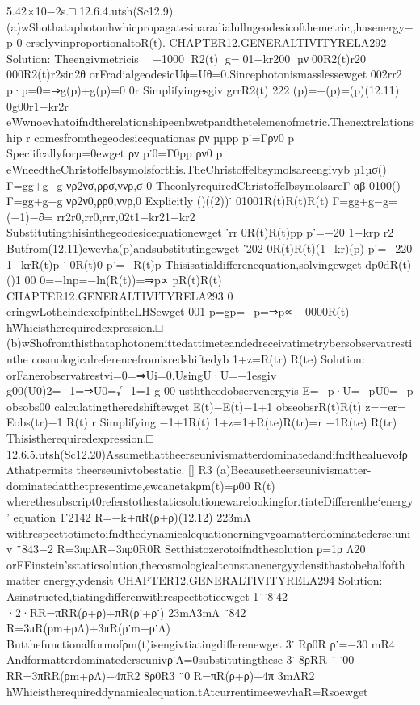 {{{{{{{{{{{{{{{{5.42×10−2s.□
12.6.4.utsh(Sc12.9)
(a)wShothataphotonhwhicpropagatesinaradialullngeodesicofthemetric,,hasenergy−p
0
erselyvinproportionaltoR(t).
CHAPTER12.GENERALTIVITYRELA292
Solution:
Theengivmetricis

−1000
R2(t)
g=01−kr200
µν00R2(t)r20
000R2(t)r2sin2θ
orFradialgeodesicUϕ=Uθ=0.Sincephotonismasslessewget
002rr2
p·p=0=⇒g(p)+g(p)=0
0r
Simplifyingesgiv
grrR2(t)
222
(p)=−(p)=(p)(12.11)
0g00r1−kr2r
eWwnoevhatoifndtherelationshipeenbwetpandthetelemenofmetric.Thenextrelationship
r
comesfromthegeodesicequationas
ρν
µµpp
p˙=Γρν0
p
Speciifcallyforµ=0ewget
ρν
p˙0=Γ0pp
ρν0
p
eWneedtheChristoffelbsymolsforthis.TheChristoffelbsymolsareengivyb
µ1µσ()
Γ=gg+g−g
νρ2νσ,ρρσ,ννρ,σ
0
TheonlyrequiredChristoffelbsymolsareΓ
αβ
0100()
Γ=gg+g−g
νρ2ν0,ρρ0,ννρ,0
Explicitly
()((2))˙
01001R(t)R(t)R(t)
Γ=gg+g−g=(−1)−∂=
rr2r0,rr0,rrr,02t1−kr21−kr2
Substitutingthisinthegeodesicequationewget
˙rr
0R(t)R(t)pp
p˙=−20
1−krp
r2
Butfrom(12.11)ewevha(p)andsubstitutingewget
˙202
0R(t)R(t)(1−kr)(p)
p˙=−220
1−krR(t)p
˙
0R(t)0
p˙=−R(t)p
Thisisatialdifferenequation,solvingewget
dp0dR(t)()1
00
0=−lnp=−ln(R(t))=⇒p∝
pR(t)R(t)
CHAPTER12.GENERALTIVITYRELA293
0
eringwLotheindexofpintheLHSewget
001
p=gp=−p=⇒p∝−
0000R(t)
hWhicistherequiredexpression.□
(b)wShofromthisthataphotonemittedattimeteandedreceivatimetrybersobservatrestinthe
cosmologicalreferencefromisredshiftedyb
1+z=R(tr)
R(te)
Solution:
orFanerobservatrestvi=0=⇒Ui=0.UsingU·U=−1esgiv
g00(U0)2=−1=⇒U0=√−1=1
g
00
usththeedobservenergyis
E=−p·U=−pU0=−p
obsobs00
calculatingtheredshiftewget
E(t)−E(t)−1+1
obseobsrR(t)R(t)
z==er=
Eobs(tr)−1
R(t)
r
Simplifying
−1+1R(t)
1+z=1+R(te)R(tr)=r
−1R(te)
R(tr)
Thisistherequiredexpression.□
12.6.5.utsh(Sc12.20)AssumethattheerseunivismatterdominatedandifndthealuevofρΛthatpermits
theerseunivtobestatic.
[]
R3
(a)Becausetheerseunivismatter-dominatedatthetpresentime,ewcanetakρm(t)=ρ00
R(t)
wherethesubscript0referstothestaticsolutionewarelookingfor.tiateDifferenthe‘energy’
equation
1˙2142
R=−k+πR(ρ+ρ)(12.12)
223mΛ
withrespecttotimetoifndthedynamicalequationerningvgoamatterdominatederse:univ
¨843−2
R=3πρΛR−3πρ0R0R
Setthistozerotoifndthesolution
ρ=1ρ
Λ20
orFEinstein’sstaticsolution,thecosmologicaltconstanenergyydensithastobehalfofthmatter
energy.ydensit
CHAPTER12.GENERALTIVITYRELA294
Solution:
Asinstructed,tiatingdifferenwithrespecttotieewget
1¨˙8˙42
·2·RR=πRR(ρ+ρ)+πR(ρ˙+ρ˙)
23mΛ3mΛ
¨842
R=3πR(ρm+ρΛ)+3πR(ρ˙m+ρ˙Λ)
Butthefunctionalformofρm(t)isengivtiatingdifferenewget
3˙
Rρ0R
ρ˙=−30
mR4
Andformatterdominatederseunivρ˙Λ=0substitutingthese
3˙
8ρRR
¨˙˙00
RR=3πRR(ρm+ρΛ)−4πR2
8ρ0R3
¨0
R=πR(ρ+ρ)−4π
3mΛR2
hWhicistherequireddynamicalequation.tAtcurrentimeewevhaR=Rsoewget
}}}}}}}}}}}}}}}}
